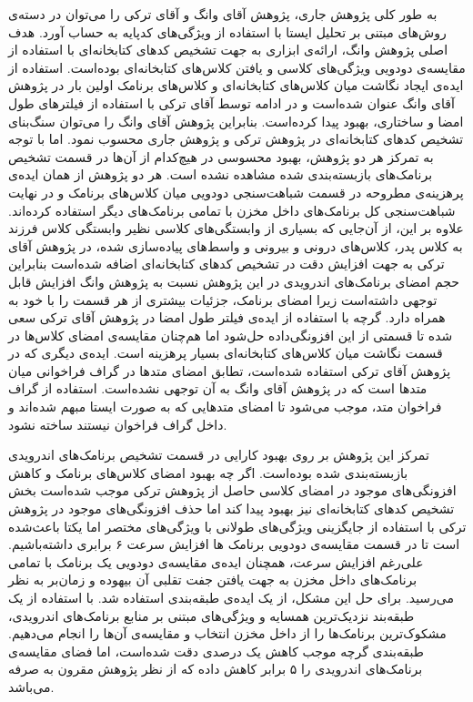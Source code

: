 به طور کلی پژوهش جاری، پژوهش آقای وانگ  و آقای ترکی  را می‌توان در دسته‌ی روش‌های مبتنی بر تحلیل ایستا با استفاده از ویژگی‌های کد‌پایه به حساب آورد. هدف اصلی پژوهش وانگ، ارائه‌ی ابزاری به جهت تشخیص کد‌های کتابخانه‌ای با استفاده از مقایسه‌ی دودویی ویژگی‌های کلاسی و یافتن کلاس‌های کتابخانه‌ای بوده‌است. استفاده از ایده‌ی ایجاد نگاشت میان کلاس‌های کتابخانه‌ای و کلاس‌های برنامک اولین بار در پژوهش آقای وانگ عنوان شده‌است و در ادامه توسط آقای ترکی با استفاده از فیلتر‌های طول‌ امضا و ساختاری، بهبود پیدا کرده‌است. بنابراین پژوهش آقای وانگ را می‌توان سنگ‌بنای تشخیص کد‌های کتابخانه‌ای در پژوهش ترکی و پژوهش جاری محسوب نمود. اما با توجه به تمرکز هر دو پژوهش، بهبود محسوسی در هیچ‌کدام از آن‌ها در قسمت تشخیص برنامک‌های بازبسته‌بندی شده مشاهده نشده است. هر دو پژوهش از همان ایده‌ی پرهزینه‌ی مطروحه در قسمت شباهت‌سنجی دودویی میان کلاس‌های برنامک و در نهایت شباهت‌سنجی کل برنامک‌های داخل مخزن با تمامی برنامک‌های دیگر استفاده کرده‌اند. علاوه بر این، از آن‌جایی که بسیاری از وابستگی‌های کلاسی نظیر وابستگی‌ کلاس فرزند به کلاس پدر، کلاس‌های درونی و بیرونی و واسط‌های پیاده‌سازی شده، در پژوهش آقای ترکی به جهت افزایش دقت در تشخیص کد‌های کتابخانه‌ای اضافه شده‌است بنابراین حجم امضای برنامک‌های اندرویدی در این پژوهش نسبت به پژوهش وانگ افزایش قابل توجهی داشته‌است زیرا امضای برنامک، جزئیات بیشتری از هر قسمت را با خود به همراه دارد. گرچه با استفاده از ایده‌ی فیلتر طول امضا در پژوهش آقای ترکی سعی شده‌ تا قسمتی از این افزونگی‌داده حل‌شود اما هم‌چنان  مقایسه‌ی امضای کلاس‌ها در قسمت نگاشت میان کلاس‌های کتابخانه‌ای بسیار پرهزینه‌ است. ایده‌ی دیگری که در پژوهش آقای ترکی استفاده شده‌است، تطابق امضای متد‌ها در گراف فراخوانی‌ میان متد‌ها است که در پژوهش آقای وانگ به آن توجهی نشده‌است. استفاده از گراف فراخوان متد، موجب می‌شود تا امضای متد‌هایی که به صورت ایستا مبهم شده‌اند و داخل گراف فراخوان نیستند ساخته نشود. 

تمرکز این پژوهش بر روی بهبود کارایی در قسمت تشخیص برنامک‌های اندرویدی بازبسته‌بندی شده بوده‌است. اگر چه بهبود امضای کلاس‌های برنامک و کاهش افزونگی‌های موجود در امضای کلاسی حاصل از پژوهش ترکی موجب شده‌است بخش تشخیص کد‌های کتابخانه‌ای نیز بهبود پیدا کند اما حذف افزونگی‌های موجود در پژوهش ترکی با استفاده از جایگزینی ویژگی‌های طولانی با ویژگی‌های مختصر اما یکتا باعث‌شده است تا در قسمت مقایسه‌ی دودویی برنامک ها افزایش سرعت ۶ برابری داشته‌باشیم. علی‌رغم افزایش سرعت، همچنان ایده‌ی مقایسه‌ی دودویی یک برنامک با تمامی برنامک‌های داخل مخزن به جهت یافتن جفت تقلبی آن بیهوده‌ و زمان‌بر به نظر می‌رسید. برای حل این مشکل، از یک ایده‌ی طبقه‌بندی استفاده شد. با استفاده از یک طبقه‌بند نزدیک‌ترین همسایه و ویژگی‌های مبتنی بر منابع برنامک‌های اندرویدی، مشکوک‌ترین برنامک‌ها را از داخل مخزن انتخاب و مقایسه‌ی آن‌ها را انجام می‌دهیم. طبقه‌بندی گرچه موجب کاهش یک درصدی دقت شده‌است، اما فضای مقایسه‌ی برنامک‌های اندرویدی را ۵ برابر کاهش داده‌ که از نظر پژوهش مقرون به صرفه ‌می‌باشد.

